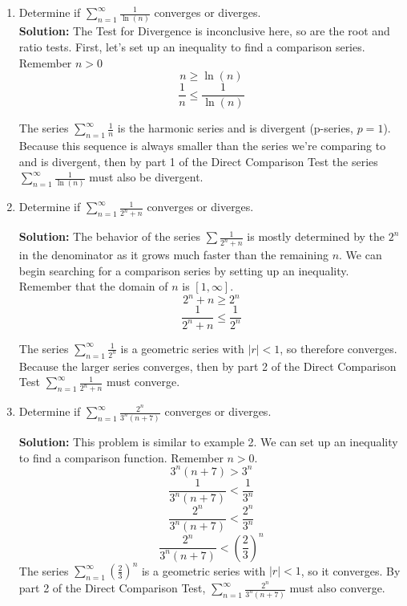 \documentclass[12pt]{report}
\begin{document}
\begin{enumerate}
	\item Determine if $\sum_{n=1}^{\infty} \frac{1}{\ln(n)}$ converges or diverges. \\
	
	\textbf{Solution:} The Test for Divergence is inconclusive here, so are the root and ratio tests. First, let's set up an inequality to find a comparison series. Remember $n > 0$
		$$n \geq \ln(n)$$
		$$\frac{1}{n} \leq \frac{1}{\ln(n)}$$
	
	The series $\sum_{n=1}^{\infty} \frac{1}{n}$ is the harmonic series and is divergent (p-series, $p=1$). Because this sequence is always smaller than the series we're comparing to and is divergent, then by part 1 of the Direct Comparison Test the series $\sum_{n=1}^{\infty} \frac{1}{\ln(n)}$ must also be divergent.

	\item Determine if $\sum_{n=1}^{\infty} \frac{1}{2^n+n}$ converges or diverges.
	
	\textbf{Solution:} The behavior of the series $\sum \frac{1}{2^n+n}$ is mostly determined by the $2^n$ in the denominator as it grows much faster than the remaining $n$. We can begin searching for a comparison series by setting up an inequality. Remember that the domain of $n$ is $[1, \infty]$.
		$$2^n + n \geq 2^n$$
		$$\frac{1}{2^n+n} \leq \frac{1}{2^n}$$
		
	The series $\sum_{n=1}^{\infty} \frac{1}{2^n}$ is a geometric series with $|r| < 1$, so therefore converges. Because the larger series converges, then by part 2 of the Direct Comparison Test $\sum_{n=1}^{\infty} \frac{1}{2^n+n}$ must converge.
	
	\item Determine if $\sum_{n=1}^{\infty} \frac{2^n}{3^n(n+7)}$ converges or diverges.
	
	\textbf{Solution:} This problem is similar to example 2. We can set up an inequality to find a comparison function. Remember $n > 0$.
		$$3^n(n+7) > 3^n$$
		$$\frac{1}{3^n(n+7)} < \frac{1}{3^n}$$
		$$\frac{2^n}{3^n(n+7)} < \frac{2^n}{3^n}$$
		$$\frac{2^n}{3^n(n+7)} < \left( \frac{2}{3} \right)^n$$
	The series $\sum_{n=1}^{\infty} \left( \frac{2}{3} \right)^n$ is a geometric series with $|r| < 1$, so it converges. By part 2 of the Direct Comparison Test, $\sum_{n=1}^{\infty} \frac{2^n}{3^n(n+7)}$ must also converge.
	
\end{enumerate}
\end{document}
